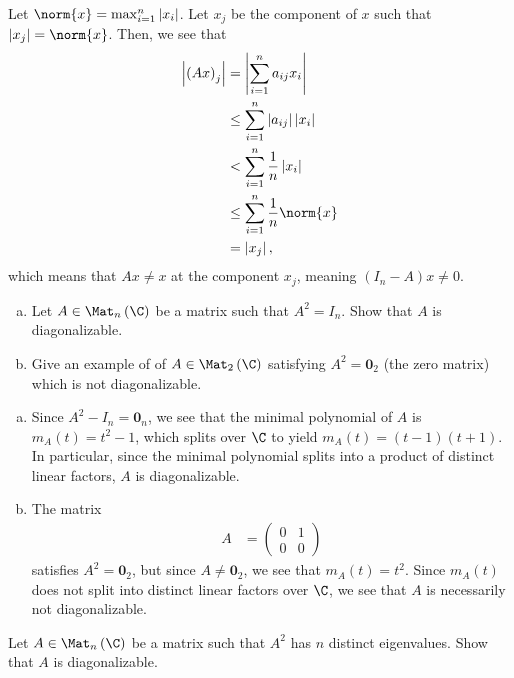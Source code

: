 \documentclass[10pt]{mypackage}
\begin{document}
\begin{solution}
  Let $\norm{x} = \max_{i=1}^{n} \left\vert x_i \right\vert$. Let $x_j$ be the component of $x$ such that $\left\vert x_j \right\vert = \norm{x}$. Then, we see that
  \begin{align*}
    \left\vert \left( Ax \right)_j \right\vert &= \left\vert \sum_{i=1}^{n}a_{ij}x_i \right\vert\\
                                               &\leq \sum_{i=1}^{n} \left\vert a_{ij} \right\vert\left\vert x_i \right\vert\\
                                               &< \sum_{i=1}^{n} \frac{1}{n}\left\vert x_i \right\vert\\
                                               &\leq \sum_{i=1}^{n}\frac{1}{n}\norm{x}\\
                                               &= \left\vert x_j \right\vert,
  \end{align*}
  which means that $Ax\neq x$ at the component $x_j$, meaning $\left( I_n - A \right)x \neq 0$.
\end{solution}
\begin{problem}[Problem 7]\hfill
  \begin{enumerate}[(a)]
    \item Let $A\in \Mat_{n}\left( \C \right)$ be a matrix such that $A^2 = I_{n}$. Show that $A$ is diagonalizable.
    \item Give an example of of $A\in \Mat_{2}\left( \C \right)$ satisfying $A^2 = \mathbf{0}_{2}$ (the zero matrix) which is not diagonalizable.
  \end{enumerate}
\end{problem}
\begin{solution}\hfill
  \begin{enumerate}[(a)]
    \item Since $A^2- I_n = \mathbf{0}_{n}$, we see that the minimal polynomial of $A$ is $m_A(t) = t^2 - 1$, which splits over $\C$ to yield $m_A(t) = \left( t-1 \right)\left( t+1 \right)$. In particular, since the minimal polynomial splits into a product of distinct linear factors, $A$ is diagonalizable.
    \item The matrix
      \begin{align*}
        A &= \begin{pmatrix}0 & 1 \\ 0 & 0\end{pmatrix}
      \end{align*}
      satisfies $A^2 = \mathbf{0}_{2}$, but since $A \neq \mathbf{0}_{2}$, we see that $m_{A}(t) = t^2$. Since $m_A(t)$ does not split into distinct linear factors over $\C$, we see that $A$ is necessarily not diagonalizable.
  \end{enumerate}
\end{solution}
\begin{problem}[Problem 8]
  Let $A\in \Mat_{n}\left( \C \right)$ be a matrix such that $A^2$ has $n$ distinct eigenvalues. Show that $A$ is diagonalizable.
\end{problem}
\end{document}
